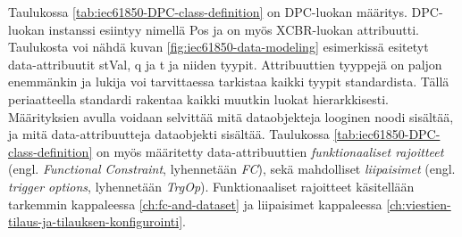 Taulukossa \ref{tab:iec61850-DPC-class-definition} on DPC-luokan määritys. DPC-luokan instanssi esiintyy nimellä Pos ja on myös XCBR-luokan attribuutti. Taulukosta voi nähdä kuvan \ref{fig:iec61850-data-modeling} esimerkissä esitetyt data-attribuutit stVal, q ja t ja niiden tyypit. Attribuuttien tyyppejä on paljon enemmänkin ja lukija voi tarvittaessa tarkistaa kaikki tyypit standardista. Tällä periaatteella standardi rakentaa kaikki muutkin luokat hierarkkisesti. Määrityksien avulla voidaan selvittää mitä dataobjekteja looginen noodi sisältää, ja mitä data-attribuutteja dataobjekti sisältää. Taulukossa \ref{tab:iec61850-DPC-class-definition} on myös määritetty data-attribuuttien \emph{funktionaaliset rajoitteet} (engl. \emph{Functional Constraint}, lyhennetään \emph{FC}), sekä mahdolliset \emph{liipaisimet} (engl. \emph{trigger options}, lyhennetään \emph{TrgOp}). Funktionaaliset rajoitteet käsitellään tarkemmin kappaleessa \ref{ch:fc-and-dataset} ja liipaisimet kappaleessa \ref{ch:viestien-tilaus-ja-tilauksen-konfigurointi}.

